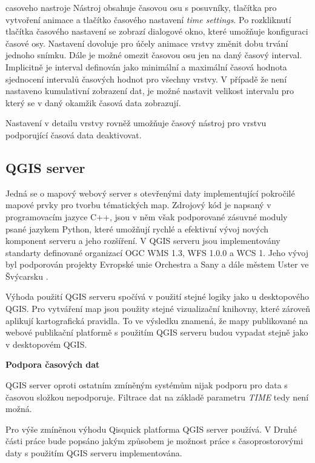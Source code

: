 casoveho nastroje Nástroj obsahuje časovou osu s posuvníky, tlačítka
pro vytvoření animace a tlačítko časového nastavení \textit{time
settings}. Po rozkliknutí tlačítka časového nastavení se zobrazí
dialogové okno, které umožňuje konfiguraci časové osy. Nastavení
dovoluje pro účely animace vrstvy změnit dobu trvání jednoho
snímku. Dále je možné omezit časovou osu jen na daný časový
interval. Implicitně je interval definován jako minimální a maximální
časová hodnota sjednocení intervalů časových hodnot pro všechny
vrstvy. V případě že není nastaveno kumulativní zobrazení dat, je
možné nastavit velikost intervalu pro který se v daný okamžik časová
data zobrazují.

Nastavení v detailu vrstvy rovněž umožňuje časový nástroj pro vrstvu
podporující časová data deaktivovat.

\newpage
\subsection{QGIS server}

Jedná se o mapový webový server s otevřenými daty implementující
pokročilé mapové prvky pro tvorbu tématických map. Zdrojový kód je
napsaný v programovacím jazyce C++, jsou v něm však podporované
zásuvné moduly psané jazykem Python, které umožňují rychlé a efektivní
vývoj nových komponent serveru a jeho rozšíření. V QGIS serveru jsou
implementovány standarty definované organizací OGC WMS 1.3, WFS 1.0.0
a WCS 1. Jeho vývoj byl podporován projekty Evropské unie Orchestra a
Sany a dále městem Uster ve Švýcarsku \cite{qgis-server}.

Výhoda použití QGIS serveru spočívá v použití stejné logiky jako u
desktopového QGIS. Pro vytváření map jsou použity stejné vizualizační
knihovny, které zároveň aplikují kartografická pravidla. To ve
výsledku znamená, že mapy publikované na webové publikační platformě s
použitím QGIS serveru budou vypadat stejně jako v desktopovém QGIS.

\bigskip
\noindent \textbf{Podpora časových dat}

QGIS server oproti ostatním zmíněným systémům nijak podporu pro data s
časovou složkou nepodporuje. Filtrace dat na základě parametru
\textit{TIME} tedy není možná.

Pro výše zmíněnou výhodu Qisquick platforma QGIS server používá. V
Druhé části práce bude popsáno jakým způsobem je možnost práce s
časoprostorovými daty s použitím QGIS serveru implementována.

